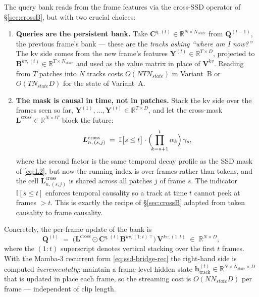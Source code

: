\documentclass[11pt,a4paper]{article}
\begin{document}
The query bank reads from the frame features via the cross-SSD
operator of \S\ref{sec:crossB}, but with two crucial choices:

\begin{enumerate}
  \item[\textbf{(a)}] \textbf{Queries are the persistent bank.}
        Take $\bm{C}^{q,(t)} \!\in\! \mathbb{R}^{N\times N_{\!state}}$
        from $\bm{Q}^{(t-1)}$, the previous frame's bank — these are
        the \emph{tracks asking ``where am I now?''} The kv side
        comes from the new frame's features
        $\bm{Y}^{(t)} \in \mathbb{R}^{T\times D}$, projected to
        $\bm{B}^{kv,(t)} \in \mathbb{R}^{T\times N_{\!state}}$ and
        used as the value matrix in place of $\bm{V}^{kv}$. Reading
        from $T$ patches into $N$ tracks costs $O(N T N_{\!state})$
        in Variant~B or $O(T N_{\!state} D)$ for the state of
        Variant~A.
  \item[\textbf{(b)}] \textbf{The mask is causal in time, not in
        patches.} Stack the kv side over the frames seen so far,
        $\bm{Y}^{(1)},\dots,\bm{Y}^{(t)}\in\mathbb{R}^{T\times D}$,
        and let the cross-mask
        $\bm{L}^{\text{cross}}\in\mathbb{R}^{N\times tT}$ block the
        future:
        \begin{equation}\label{eq:track-causal-mask}
          \bm{L}^{\text{cross}}_{n,\,(s, j)}
           \;=\; \mathbb{I}\bigl[s\le t\bigr]\cdot
                 \Bigl(\!\prod_{k=s+1}^{t}\alpha_k\Bigr)\,\gamma_s,
        \end{equation}
        where the second factor is the same temporal decay profile
        as the SSD mask of \eqref{eq:L2}, but now the running index
        is over frames rather than tokens, and the cell
        $\bm{L}^{\text{cross}}_{n,(s,j)}$ is shared across all
        patches $j$ of frame $s$. The indicator
        $\mathbb{I}[s\le t]$ enforces temporal causality so a track
        at time $t$ cannot peek at frames $>t$. This is exactly the
        recipe of \S\ref{sec:crossB} adapted from token causality to
        frame causality.
\end{enumerate}
Concretely, the per-frame update of the bank is
\begin{equation}\label{eq:track-update}
  \boxed{\;
    \bm{Q}^{(t)}
     \;=\; \bigl(\bm{L}^{\text{cross}}\odot\bm{C}^{q,(t)}\bm{B}^{kv,(1{:}t)\,\top}\bigr)\,
            \bm{V}^{kv,(1{:}t)}
     \;\in\; \mathbb{R}^{N\times D},
  \;}
\end{equation}
where the $(1{:}t)$ superscript denotes vertical stacking over the
first $t$ frames. With the Mamba-3 recurrent form
\eqref{eq:ssd-bridge-rec} the right-hand side is computed
\emph{incrementally}: maintain a frame-level hidden state
$\bm{h}^{(t)}_{\text{track}} \in \mathbb{R}^{N\!\times\!N_{\!state}\!\times\!D}$
that is updated in place each frame, so the streaming cost is
$O(N N_{\!state} D)$ per frame — independent of clip length.
\end{document}
